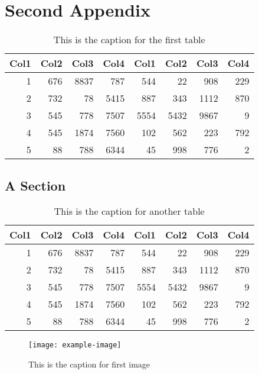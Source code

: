 \chapter{Second Appendix}
    \lipsum[1]
    \begin{table}
        \centering
        \begin{tabular}{r r r r r r r r}
             Col1 & Col2 & Col3 & Col4 & Col1 & Col2 & Col3 & Col4 \\
             \hline
             1    & 676  & 8837 & 787  & 544  & 22   & 908  & 229  \\
             2    & 732  & 78   & 5415 & 887  & 343  & 1112 & 870  \\
             3    & 545  & 778  & 7507 & 5554 & 5432 & 9867 & 9    \\
             4    & 545  & 1874 & 7560 & 102  & 562  & 223  & 792  \\
             5    & 88   & 788  & 6344 & 45   & 998  & 776  & 2    \\
             \hline
        \end{tabular}
        \caption{This is the caption for the first table}
    \end{table}
    \lipsum[2]

\section{A Section}
    \lipsum[3]
    \begin{table}
        \centering
        \begin{tabular}{r r r r r r r r}
             Col1 & Col2 & Col3 & Col4 & Col1 & Col2 & Col3 & Col4 \\
             \hline
             1    & 676  & 8837 & 787  & 544  & 22   & 908  & 229  \\
             2    & 732  & 78   & 5415 & 887  & 343  & 1112 & 870  \\
             3    & 545  & 778  & 7507 & 5554 & 5432 & 9867 & 9    \\
             4    & 545  & 1874 & 7560 & 102  & 562  & 223  & 792  \\
             5    & 88   & 788  & 6344 & 45   & 998  & 776  & 2    \\
             \hline
        \end{tabular}
        \caption{This is the caption for another table}
    \end{table}
    \lipsum[4-5]
    \begin{figure}
        \centering
        \texttt{[image: example-image]}
        \caption{This is the caption for first image}
    \end{figure}

